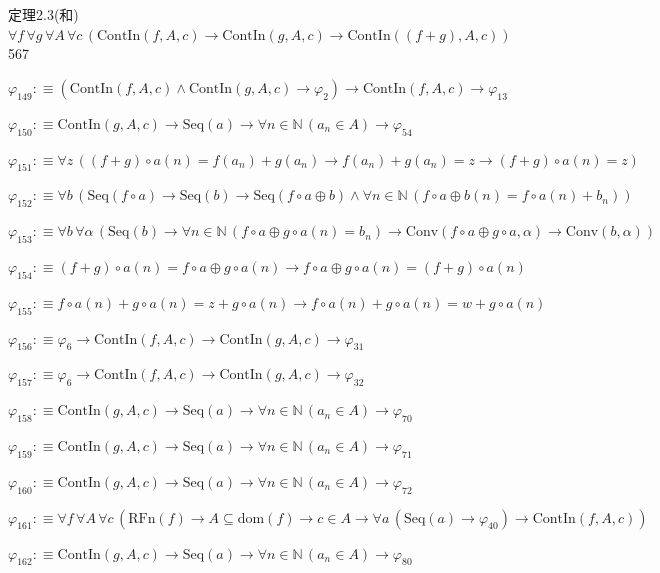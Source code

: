 \begin{fullproof}{定理2.3(和)}{$\forall f\,\forall g\,\forall A\,\forall c\,(\mathrm{ContIn}(f,A,c) \to \mathrm{ContIn}(g,A,c) \to \mathrm{ContIn}((f + g),A,c))$}{567}
\begin{abbrevlist}
\item $\varphi_{149} :\equiv (\mathrm{ContIn}(f,A,c) \land \mathrm{ContIn}(g,A,c) \to \varphi_{2}) \to \mathrm{ContIn}(f,A,c) \to \varphi_{13}$
\item $\varphi_{150} :\equiv \mathrm{ContIn}(g,A,c) \to \mathrm{Seq}(a) \to \forall n \in \mathbb{N}\,(a_{n} \in A) \to \varphi_{54}$
\item $\varphi_{151} :\equiv \forall z\,((f + g) \circ a(n) = f(a_{n}) + g(a_{n}) \to f(a_{n}) + g(a_{n}) = z \to (f + g) \circ a(n) = z)$
\item $\varphi_{152} :\equiv \forall b\,(\mathrm{Seq}(f \circ a) \to \mathrm{Seq}(b) \to \mathrm{Seq}(f \circ a \oplus b) \land \forall n \in \mathbb{N}\,(f \circ a \oplus b(n) = f \circ a(n) + b_{n}))$
\item $\varphi_{153} :\equiv \forall b\,\forall \alpha\,(\mathrm{Seq}(b) \to \forall n \in \mathbb{N}\,(f \circ a \oplus g \circ a(n) = b_{n}) \to \mathrm{Conv}(f \circ a \oplus g \circ a,\alpha) \to \mathrm{Conv}(b,\alpha))$
\item $\varphi_{154} :\equiv (f + g) \circ a(n) = f \circ a \oplus g \circ a(n) \to f \circ a \oplus g \circ a(n) = (f + g) \circ a(n)$
\item $\varphi_{155} :\equiv f \circ a(n) + g \circ a(n) = z + g \circ a(n) \to f \circ a(n) + g \circ a(n) = w + g \circ a(n)$
\item $\varphi_{156} :\equiv \varphi_{6} \to \mathrm{ContIn}(f,A,c) \to \mathrm{ContIn}(g,A,c) \to \varphi_{31}$
\item $\varphi_{157} :\equiv \varphi_{6} \to \mathrm{ContIn}(f,A,c) \to \mathrm{ContIn}(g,A,c) \to \varphi_{32}$
\item $\varphi_{158} :\equiv \mathrm{ContIn}(g,A,c) \to \mathrm{Seq}(a) \to \forall n \in \mathbb{N}\,(a_{n} \in A) \to \varphi_{70}$
\item $\varphi_{159} :\equiv \mathrm{ContIn}(g,A,c) \to \mathrm{Seq}(a) \to \forall n \in \mathbb{N}\,(a_{n} \in A) \to \varphi_{71}$
\item $\varphi_{160} :\equiv \mathrm{ContIn}(g,A,c) \to \mathrm{Seq}(a) \to \forall n \in \mathbb{N}\,(a_{n} \in A) \to \varphi_{72}$
\item $\varphi_{161} :\equiv \forall f\,\forall A\,\forall c\,(\mathrm{RFn}(f) \to A \subseteq \mathrm{dom}(f) \to c \in A \to \forall a\,(\mathrm{Seq}(a) \to \varphi_{40}) \to \mathrm{ContIn}(f,A,c))$
\item $\varphi_{162} :\equiv \mathrm{ContIn}(g,A,c) \to \mathrm{Seq}(a) \to \forall n \in \mathbb{N}\,(a_{n} \in A) \to \varphi_{80}$

\end{abbrevlist}
\end{fullproof}
